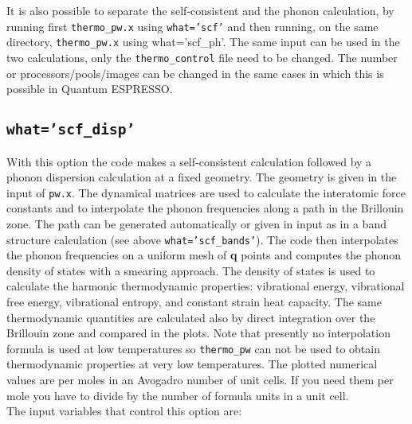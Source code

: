 \documentclass[12pt,a4paper]{article}
\begin{document}
It is also possible to separate the self-consistent and the phonon calculation,
by running first \texttt{thermo\_pw.x} using \texttt{what='scf'} and then
running, on the same directory, \texttt{thermo\_pw.x} using 
{what='scf\_ph'}. The same input can be used in the two calculations, only
the \texttt{thermo\_control} file need to be changed.
The number or processors/pools/images can be changed in the same cases in
which this is possible in Quantum ESPRESSO.

\subsection{\color{web-blue}\texttt{what='scf\_disp'}}
With this option the code makes a self-consistent calculation followed by
a phonon dispersion calculation at a fixed geometry. The geometry is given in the 
input of \texttt{pw.x}. The dynamical matrices are used to calculate 
the interatomic force constants and to interpolate the phonon frequencies 
along a path in the Brillouin zone. The path can be generated automatically 
or given in input as in a band structure calculation (see above \texttt{what='scf\_bands'}). The code then 
interpolates the phonon frequencies on a uniform mesh of {\bf q} points and 
computes the phonon density of states with a smearing approach. The density of 
states is used to calculate the harmonic thermodynamic properties: 
vibrational energy, vibrational free energy, vibrational entropy, and 
constant strain heat capacity.
The same thermodynamic quantities are calculated also by direct 
integration over the Brillouin zone and compared in the plots.
Note that presently no interpolation formula is used at low temperatures
so \texttt{thermo\_pw} can not be used to obtain thermodynamic 
properties at very low temperatures. 
The plotted numerical values are per moles in an Avogadro number of unit 
cells. If you need them per mole you have to divide by the number 
of formula units in a unit cell. \\
The input variables that control this option are:
\end{document}
